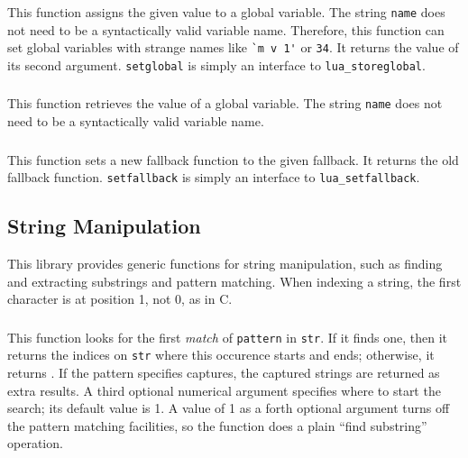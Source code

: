 \subsubsection*{}
This function assigns the given value to a global variable.
The string \verb'name' does not need to be a syntactically valid variable name.
Therefore, this function can set global variables with strange names like
\verb|`m v 1'| or \verb'34'.
It returns the value of its second argument.
\verb|setglobal| is simply an interface to \verb|lua_storeglobal|.

\subsubsection*{}
This function retrieves the value of a global variable.
The string \verb'name' does not need to be a syntactically valid variable name.

\subsubsection*{}
This function sets a new fallback function to the given fallback.
It returns the old fallback function.
\verb|setfallback| is simply an interface to \verb|lua_setfallback|.

\subsection{String Manipulation}
This library provides generic functions for string manipulation,
such as finding and extracting substrings and pattern matching.
When indexing a string, the first character is at position 1,
not 0, as in C.

\subsubsection*{}
This function looks for the first {\em match\/} of
\verb-pattern- in \verb-str-.
If it finds one, then it returns the indices on \verb-str-
where this occurence starts and ends;
otherwise, it returns \nil.
If the pattern specifies captures,
the captured strings are returned as extra results.
A third optional numerical argument specifies where to start the search;
its default value is 1.
A value of 1 as a forth optional argument
turns off the pattern matching facilities,
so the function does a plain ``find substring'' operation.

